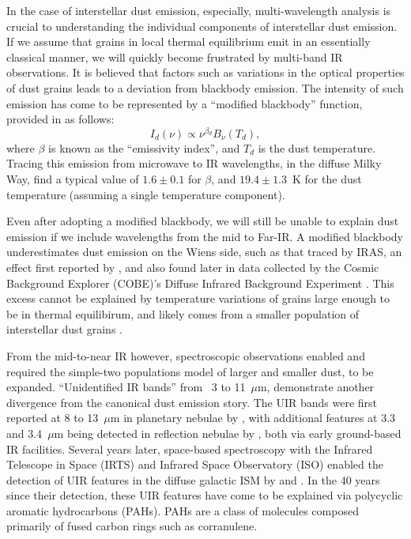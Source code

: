      In the case of interstellar dust emission, especially, multi-wavelength analysis is crucial to understanding the individual components of interstellar dust emission. If we assume that grains in local thermal equilibrium emit in an essentially classical manner, we will quickly become frustrated by multi-band IR observations. It is believed that factors such as variations in the optical properties of dust grains leads to a deviation from blackbody emission. The intensity of such emission has come to be represented by a ``modified blackbody'' function, provided in \cite{onaka99} as follows:
     \begin{equation}
         I_d(\nu) \propto \nu{}^{\beta{}_d}B_\nu{}(T_d),
         \label{eq:mbb}
     \end{equation}
     where $\beta$ is known as the ``emissivity index'', and $T_d$ is the dust temperature. Tracing this emission from microwave to IR wavelengths, in the diffuse Milky Way, \cite{planckIntXXIX16} find a typical value of $1.6 \pm 0.1$ for $\beta$, and $19.4 \pm 1.3$~K for the dust temperature (assuming a single temperature component).

     Even after adopting a modified blackbody, we will still be unable to explain dust emission if we include wavelengths from the mid to Far-IR. A modified blackbody underestimates dust emission on the Wiens side, such as that traced by IRAS, an effect first reported by \cite{boulanger85}, and also found later in data collected by the Cosmic  Background Explorer (COBE)'s Diffuse Infrared Background Experiment \citep{sodroski87, sodroski94}. This excess cannot be explained by temperature variations of grains large enough to be in thermal equilibirum, and likely comes from a smaller population of interstellar dust grains \citep{purcell76, sellgren84,dwek86,draine01}.

     From the mid-to-near IR however, spectroscopic observations enabled and required the simple-two populations model of larger and smaller dust, to be expanded. ``Unidentified IR bands'' from~ 3 to 11~$\mu$m, demonstrate another divergence from the canonical dust emission story. The UIR bands were first reported at 8 to 13~$\mu$m in planetary nebulae by \cite{gillet73}, with additional features at 3.3 and 3.4~$\mu$m being detected in reflection nebulae by \cite{sellgren83}, both via early ground-based IR facilities. Several years later, space-based spectroscopy with the Infrared Telescope in Space (IRTS)\citep{murakami96} and Infrared Space Observatory (ISO)\citep{kessler96} enabled the detection of UIR features in the diffuse galactic ISM by \cite{onaka96} and \cite{mattila96}. In the 40 years since their detection, these UIR features have come to be explained via polycyclic aromatic hydrocarbons (PAHs)\citep{allamandola85,puget85, hony01}. PAHs are a class of molecules composed primarily of fused carbon rings such as corranulene.

